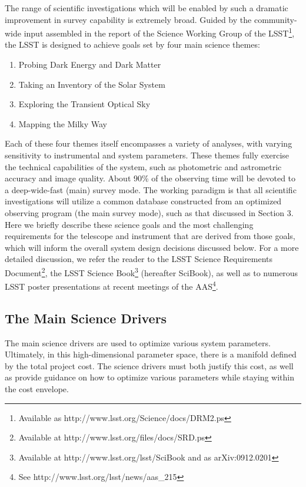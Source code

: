 \documentclass{emulateapj}
\newcommand{\B}[1]{{#1}}
\begin{document}
The range of scientific investigations which will be enabled by such a 
dramatic improvement in survey capability is extremely broad. Guided by
the community-wide input assembled in the report of the Science Working Group of the
LSST\footnote{Available as 
http://www.lsst.org/Science/docs/DRM2.ps}, the LSST is designed to 
achieve goals set by four main science themes:

\begin{enumerate}
\item Probing Dark Energy and Dark Matter
\item Taking an Inventory of the Solar System
\item Exploring the Transient Optical Sky
\item Mapping the Milky Way
\end{enumerate}

Each of these four themes itself encompasses a variety of analyses, with 
varying sensitivity to instrumental and system parameters. These themes 
fully exercise the technical capabilities of the system, such as photometric 
and astrometric accuracy and image quality. About 90\% of the observing time 
will be devoted to a deep-wide-fast (main) survey mode. The working paradigm is that all 
scientific investigations will utilize a common database constructed from an optimized 
observing program (the main survey mode), such as that discussed in Section 3. 
Here we briefly describe these science goals and the most challenging requirements for the 
telescope and instrument that are derived from those goals, which will
inform the overall system design decisions discussed below.
For a more detailed discussion, we refer the reader to the LSST Science Requirements 
Document\footnote{Available at 
http://www.lsst.org/files/docs/SRD.ps}, 
\B{the LSST Science Book}\footnote{Available at
http://www.lsst.org/lsst/SciBook and as arXiv:0912.0201} (hereafter SciBook),
as well as to numerous LSST poster presentations at recent
meetings of the AAS\footnote{See
http://www.lsst.org/lsst/news/aas\_215}. 


\subsection{The Main Science Drivers }

The main science drivers are used to optimize various system parameters.
Ultimately, in this high-dimensional parameter space, there is a 
manifold defined by the total project cost. The science
drivers must both justify this cost, as well as provide guidance
on how to optimize various parameters while staying within the cost envelope.
\end{document}
